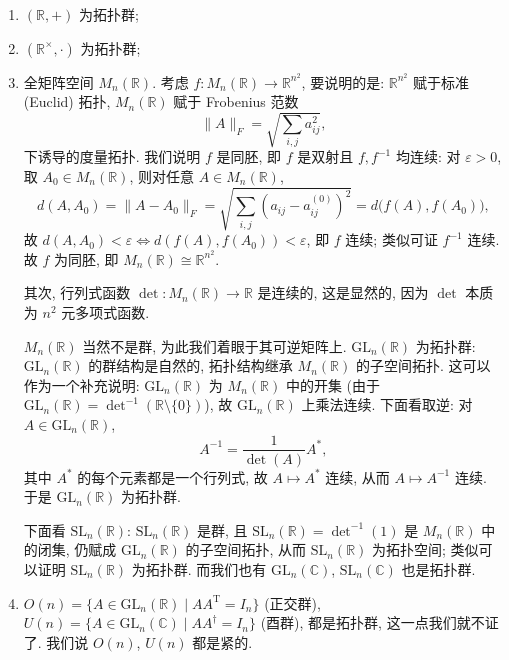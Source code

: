 \begin{example}\label{ex:topological-groups}
\mbox{}\par\vspace{-0.2em}
\begin{enumerate}
  \item $(\mathbb{R},+)$ 为拓扑群;
  \item $(\mathbb{R}^{\times},\cdot)$ 为拓扑群;
  \item 全矩阵空间 $M_n(\mathbb{R})$. 考虑 $f\colon M_n(\mathbb{R})\to\mathbb{R}^{n^2}$,
  要说明的是: $\mathbb{R}^{n^2}$ 赋于标准 (Euclid) 拓扑, $M_n(\mathbb{R})$ 赋于
  Frobenius 范数
  \[
    \|A\|_F=\sqrt{\sum_{i,j}a_{ij}^2},
  \]
  下诱导的度量拓扑. 我们说明 $f$ 是同胚, 即 $f$ 是双射且 $f,f^{-1}$ 均连续:
  对 $\varepsilon>0$, 取 $A_0\in M_n(\mathbb{R})$, 则对任意 $A\in M_n(\mathbb{R})$,
  \[
    d(A,A_0)=\|A-A_0\|_F=\sqrt{\sum_{i,j}(a_{ij}-a_{ij}^{(0)})^2}=d\bigl(f(A),f(A_0)\bigr),
  \]
  故 $d(A,A_0)<\varepsilon\iff d(f(A),f(A_0))<\varepsilon$, 即 $f$ 连续;
  类似可证 $f^{-1}$ 连续. 故 $f$ 为同胚, 即 $M_n(\mathbb{R})\cong\mathbb{R}^{n^2}$.

  其次, 行列式函数 $\det\colon M_n(\mathbb{R})\to\mathbb{R}$ 是连续的, 这是显然的,
  因为 $\det$ 本质为 $n^2$ 元多项式函数.

  $M_n(\mathbb{R})$ 当然不是群, 为此我们着眼于其可逆矩阵上.
  $\mathrm{GL}_n(\mathbb{R})$ 为拓扑群:
  $\mathrm{GL}_n(\mathbb{R})$ 的群结构是自然的, 拓扑结构继承 $M_n(\mathbb{R})$ 的子空间拓扑.
  这可以作为一个补充说明: $\mathrm{GL}_n(\mathbb{R})$ 为 $M_n(\mathbb{R})$ 中的开集
  (由于 $\mathrm{GL}_n(\mathbb{R})=\det^{-1}(\mathbb{R}\setminus\{0\})$),
  故 $\mathrm{GL}_n(\mathbb{R})$ 上乘法连续. 下面看取逆: 对 $A\in\mathrm{GL}_n(\mathbb{R})$,
  \[
    A^{-1}=\frac{1}{\det(A)}A^*,
  \]
  其中 $A^*$ 的每个元素都是一个行列式, 故 $A\mapsto A^*$ 连续, 从而 $A\mapsto A^{-1}$ 连续.
  于是 $\mathrm{GL}_n(\mathbb{R})$ 为拓扑群.

  下面看 $\mathrm{SL}_n(\mathbb{R})$: $\mathrm{SL}_n(\mathbb{R})$ 是群, 且
  $\mathrm{SL}_n(\mathbb{R})=\det^{-1}(1)$ 是 $M_n(\mathbb{R})$ 中的闭集,
  仍赋成 $\mathrm{GL}_n(\mathbb{R})$ 的子空间拓扑, 从而 $\mathrm{SL}_n(\mathbb{R})$ 为拓扑空间;
  类似可以证明 $\mathrm{SL}_n(\mathbb{R})$ 为拓扑群.
  而我们也有 $\mathrm{GL}_n(\mathbb{C})$, $\mathrm{SL}_n(\mathbb{C})$ 也是拓扑群.

  \item $O(n)=\{A\in\mathrm{GL}_n(\mathbb{R})\mid AA^{\mathrm{T}}=I_n\}$ (正交群),
  $U(n)=\{A\in\mathrm{GL}_n(\mathbb{C})\mid AA^{\dagger}=I_n\}$ (酉群),
  都是拓扑群, 这一点我们就不证了. 我们说 $O(n)$, $U(n)$ 都是紧的.
\end{enumerate}
\end{example}

